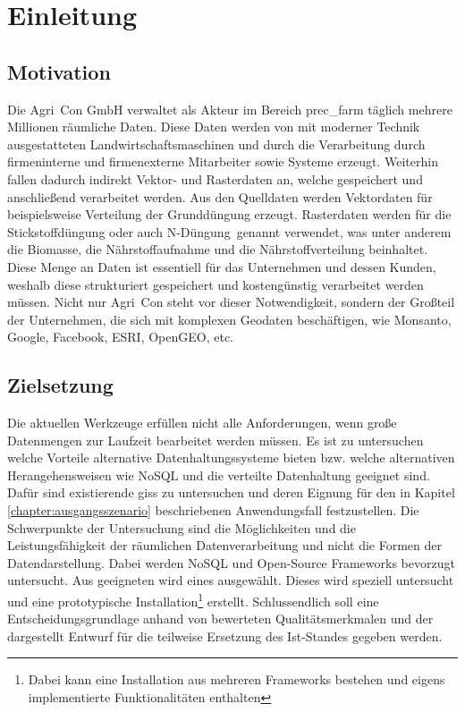 \chapter{Einleitung}


\section{Motivation}

Die Agri~Con GmbH verwaltet als Akteur im Bereich \Gls{prec_farm} täglich mehrere Millionen räumliche Daten. Diese Daten werden von mit moderner Technik ausgestatteten Landwirtschaftsmaschinen und durch die Verarbeitung durch firmeninterne und firmenexterne Mitarbeiter sowie Systeme erzeugt. Weiterhin fallen dadurch indirekt Vektor- und Rasterdaten an, welche gespeichert und anschließend verarbeitet werden.
Aus den Quelldaten werden Vektordaten für beispielsweise Verteilung der Grunddüngung erzeugt. Rasterdaten werden für die Stickstoffdüngung oder auch \glqq N-Düngung\grqq\ genannt verwendet, was unter anderem die Biomasse, die Nährstoffaufnahme und die Nährstoffverteilung beinhaltet.
Diese Menge an Daten ist essentiell für das Unternehmen und dessen Kunden, weshalb diese strukturiert gespeichert und kostengünstig verarbeitet werden müssen. Nicht nur Agri~Con steht vor dieser Notwendigkeit, sondern der Großteil der Unternehmen, die sich mit komplexen Geodaten beschäftigen, wie Monsanto, Google, Facebook, ESRI, OpenGEO, etc.




\section{Zielsetzung}

Die aktuellen Werkzeuge erfüllen nicht alle Anforderungen, wenn große Datenmengen zur Laufzeit bearbeitet werden müssen. Es ist zu untersuchen welche Vorteile alternative Datenhaltungssysteme bieten bzw. welche alternativen Herangehensweisen wie NoSQL und die verteilte Datenhaltung geeignet sind.
Dafür sind existierende \Glspl{gis} zu untersuchen und deren Eignung für den in Kapitel \ref{chapter:ausgangsszenario} beschriebenen Anwendungsfall festzustellen. Die Schwerpunkte der Untersuchung sind die Möglichkeiten und die Leistungsfähigkeit der räumlichen Datenverarbeitung und nicht die Formen der Datendarstellung.
Dabei werden NoSQL und Open-Source Frameworks bevorzugt untersucht.
Aus geeigneten wird eines ausgewählt. Dieses wird speziell untersucht und eine prototypische Installation\footnote{Dabei kann eine Installation aus mehreren Frameworks bestehen und eigens implementierte Funktionalitäten enthalten} erstellt.
Schlussendlich soll eine Entscheidungsgrundlage anhand von bewerteten Qualitätsmerkmalen und der dargestellt Entwurf für die teilweise Ersetzung des Ist-Standes gegeben werden.

